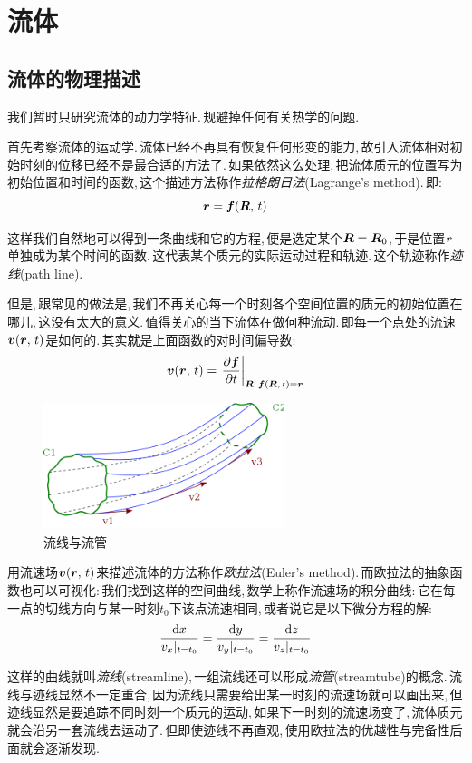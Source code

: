 \chapter{流体}



\section{流体的物理描述}

我们暂时只研究流体的动力学特征.\,规避掉任何有关热学的问题.

首先考察流体的运动学.\,流体已经不再具有恢复任何形变的能力,\,故引入流体相对初始时刻的位移已经不是最合适的方法了.\,如果依然这么处理,\,把流体质元的位置写为初始位置和时间的函数,\,这个描述方法称作\emph{拉格朗日法}(Lagrange's method).\,即:
\[\boldsymbol{r}=\boldsymbol{f}(\boldsymbol{R},\,t)\]

这样我们自然地可以得到一条曲线和它的方程,\,便是选定某个$\boldsymbol{R}=\boldsymbol{R}_0$,\,于是位置$\boldsymbol{r}$单独成为某个时间的函数.\,这代表某个质元的实际运动过程和轨迹.\,这个轨迹称作\emph{迹线}(path line).

但是,\,跟常见的做法是,\,我们不再关心每一个时刻各个空间位置的质元的初始位置在哪儿,\,这没有太大的意义.\,值得关心的当下流体在做何种流动.\,即每一个点处的流速$\boldsymbol{v}(\boldsymbol{r},\,t)$是如何的.\,其实就是上面函数的对时间偏导数:
\[\boldsymbol{v}(\boldsymbol{r},\,t)=\left.\frac{\partial \boldsymbol{f}}{\partial t}\right|_{\boldsymbol{R}:\,\boldsymbol{f}(\boldsymbol{R},\,t)=\boldsymbol{r}}\]

\begin{figure}
\vspace{-0.1cm}
\centering
\includegraphics[width=7cm]{image/6-8-1.png}
\caption{流线与流管}
\end{figure}
用流速场$\boldsymbol{v}(\boldsymbol{r},\,t)$来描述流体的方法称作\emph{欧拉法}(Euler's method).\,而欧拉法的抽象函数也可以可视化:\,我们找到这样的空间曲线,\,数学上称作流速场的积分曲线:\,它在每一点的切线方向与某一时刻$t_0$下该点流速相同,\,或者说它是以下微分方程的解:
\[\frac{\textrm{d} x}{v_x|_{t=t_0}}=\frac{\textrm{d} y}{v_y|_{t=t_0}}=\frac{\textrm{d} z}{v_z|_{t=t_0}}\]

这样的曲线就叫\emph{流线}(streamline),\,一组流线还可以形成\emph{流管}(streamtube)的概念.\,流线与迹线显然不一定重合,\,因为流线只需要给出某一时刻的流速场就可以画出来,\,但迹线显然是要追踪不同时刻一个质元的运动,\,如果下一时刻的流速场变了,\,流体质元就会沿另一套流线去运动了.\,但即使迹线不再直观,\,使用欧拉法的优越性与完备性后面就会逐渐发现.

